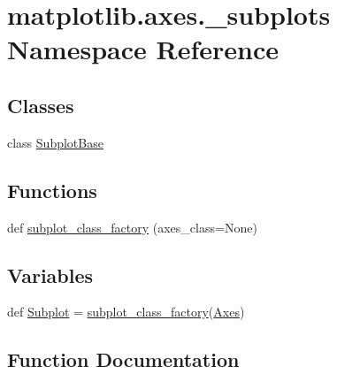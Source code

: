 \hypertarget{namespacematplotlib_1_1axes_1_1__subplots}{}\section{matplotlib.\+axes.\+\_\+subplots Namespace Reference}
\label{namespacematplotlib_1_1axes_1_1__subplots}
\subsection*{Classes}
\begin{DoxyCompactItemize}
\item 
class \hyperlink{classmatplotlib_1_1axes_1_1__subplots_1_1SubplotBase}{Subplot\+Base}
\end{DoxyCompactItemize}
\subsection*{Functions}
\begin{DoxyCompactItemize}
\item 
def \hyperlink{namespacematplotlib_1_1axes_1_1__subplots_ab66c3fe9ccac642abb803b6db11604ca}{subplot\+\_\+class\+\_\+factory} (axes\+\_\+class=None)
\end{DoxyCompactItemize}
\subsection*{Variables}
\begin{DoxyCompactItemize}
\item 
def \hyperlink{namespacematplotlib_1_1axes_1_1__subplots_a07ab982b24a7360954cc660162a70e2f}{Subplot} = \hyperlink{namespacematplotlib_1_1axes_1_1__subplots_ab66c3fe9ccac642abb803b6db11604ca}{subplot\+\_\+class\+\_\+factory}(\hyperlink{classmatplotlib_1_1axes_1_1__axes_1_1Axes}{Axes})
\end{DoxyCompactItemize}


\subsection{Function Documentation}
\mbox{\label{namespacematplotlib_1_1axes_1_1__subplots_ab66c3fe9ccac642abb803b6db11604ca}} 
